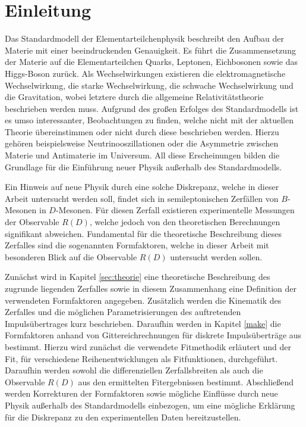 \chapter{Einleitung}

Das Standardmodell der Elementarteilchenphysik beschreibt den Aufbau der Materie mit einer beeindruckenden Genauigkeit.
Es führt die Zusammensetzung der Materie auf die Elementarteilchen Quarks, Leptonen, Eichbosonen sowie das Higgs-Boson zurück.
Als Wechselwirkungen existieren die elektromagnetische Wechselwirkung, die starke Wechselwirkung, die schwache Wechselwirkung und die Gravitation, wobei letztere durch die allgemeine Relativitätstheorie beschrieben werden muss.
Aufgrund des großen Erfolges des Standardmodells ist es umso interessanter, Beobachtungen zu finden, welche nicht mit der aktuellen Theorie übereinstimmen oder nicht durch diese beschrieben werden.
Hierzu gehören beispielsweise Neutrinooszillationen oder die Asymmetrie zwischen Materie und Antimaterie im Universum.
All diese Erscheinungen bilden die Grundlage für die Einführung neuer Physik außerhalb des Standardmodells.

Ein Hinweis auf neue Physik durch eine solche Diskrepanz, welche in dieser Arbeit untersucht werden soll, findet sich in semileptonischen Zerfällen von $B$-Mesonen in $D$-Mesonen.
Für diesen Zerfall existieren experimentelle Messungen der Observable $R(D)$, welche jedoch von den theoretischen Berechnungen signifikant abweichen.
Fundamental für die theoretische Beschreibung dieses Zerfalles sind die sogenannten Formfaktoren, welche in dieser Arbeit mit besonderen Blick auf die Observable $R(D)$ untersucht werden sollen.

Zunächst wird in Kapitel \ref{sec:theorie} eine theoretische Beschreibung des zugrunde liegenden Zerfalles sowie in diesem Zusammenhang eine Definition der verwendeten Formfaktoren angegeben.
Zusätzlich werden die Kinematik des Zerfalles und die möglichen Parametrisierungen des auftretenden Impulsübertrages kurz beschrieben.
Daraufhin werden in Kapitel \ref{make} die Formfaktoren anhand von Gittereichrechnungen für diskrete Impulsüberträge aus \cite{PhysRevD.92.034506} bestimmt.
Hierzu wird zunächst die verwendete Fitmethodik erläutert und der Fit, für verschiedene Reihenentwicklungen als Fitfunktionen, durchgeführt.
Daraufhin werden sowohl die differenziellen Zerfallsbreiten als auch die Observable $R(D)$ aus den ermittelten Fitergebnissen bestimmt.
Abschließend werden Korrekturen der Formfaktoren sowie mögliche Einflüsse durch neue Physik außerhalb des Standardmodells einbezogen, um eine mögliche Erklärung für die Diskrepanz zu den experimentellen Daten bereitzustellen.
